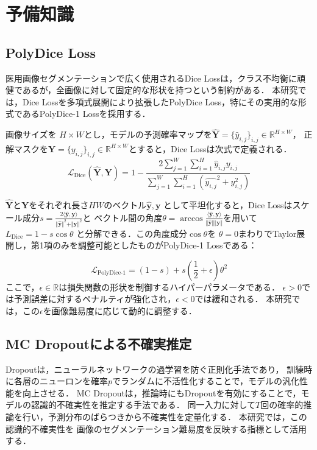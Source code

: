 \documentclass[a4paper,platex,dvipdfmx,twocolumn]{jsarticle}
\begin{document}
\section{予備知識}
\subsection{PolyDice Loss}
医用画像セグメンテーションで広く使用されるDice Lossは，クラス不均衡に頑健であるが，全画像に対して固定的な形状を持つという制約がある．
本研究では，Dice Lossを多項式展開により拡張したPolyDice Loss\cite{polydice}，特にその実用的な形式であるPolyDice-1 Lossを採用する．

画像サイズを $H \times W$とし，モデルの予測確率マップを$\hat{\mathbf{Y}} = \{\hat{y}_{i,j}\}_{i,j} \in \mathbb R ^ {H \times W}$，
正解マスクを$\mathbf{Y} = \{{y}_{i,j}\}_{i,j} \in \mathbb R ^ {H \times W}$とすると，Dice Lossは次式で定義される．
\begin{equation}
    \mathcal{L}_{\text{Dice}}(\hat{\mathbf{Y}}, \mathbf{Y}) = 1 - \frac{2 \sum_{j=1}^{W} \sum_{i=1}^{H} \hat{y}_{i, j} y_{i, j}}{\sum_{j=1}^{W} \sum_{i=1}^{H}(\hat{y_{i, j}} ^ 2 + y_{i, j} ^ 2)}
\end{equation}

$\hat{\mathbf{Y}}$と$\mathbf{Y}$をそれぞれ長さ$HW$のベクトル$\hat{\mathbf{y}}, \mathbf{y}$
として平坦化すると，Dice Lossはスケール成分$s = \frac{2 \langle \hat{\mathbf{y}}, {\mathbf{y}} \rangle}{\Vert \hat{\mathbf{y}} \Vert ^ 2 + \Vert {\mathbf{y}} \Vert ^ 2}$と
ベクトル間の角度$\theta = \arccos{\frac{\langle \hat{\mathbf{y}}, {\mathbf{y}}\rangle}{\Vert \hat{\mathbf{y}} \Vert \Vert {\mathbf{y}}\Vert}}$を用いて
$L_{\text{Dice}} = 1 - s \cos \theta$ と分解できる．この角度成分$\cos \theta$を
$\theta = 0$まわりでTaylor展開し，第1項のみを調整可能としたものがPolyDice-1 Lossである：

\begin{equation}
    \mathcal{L}_{\text{PolyDice-1}} = (1 - s) + s \left(\frac{1}{2} + \epsilon\right) \theta^2
\end{equation}
ここで，$\epsilon \in \mathbb{R}$は損失関数の形状を制御するハイパーパラメータである．
$\epsilon > 0$では予測誤差に対するペナルティが強化され，$\epsilon < 0$では緩和される．
本研究では，この$\epsilon$を画像難易度に応じて動的に調整する．
\subsection{MC Dropoutによる不確実推定}

Dropout\cite{pmlr-v48-gal16}は，ニューラルネットワークの過学習を防ぐ正則化手法であり，
訓練時に各層のニューロンを確率$p$でランダムに不活性化することで，モデルの汎化性能を向上させる．
MC Dropout\cite{pmlr-v48-gal16}は，推論時にもDropoutを有効にすることで，モデルの認識的不確実性を推定する手法である．
同一入力に対して$T$回の確率的推論を行い，予測分布のばらつきから不確実性を定量化する．
本研究では，この認識的不確実性を
画像のセグメンテーション難易度を反映する指標として活用する．
\end{document}
